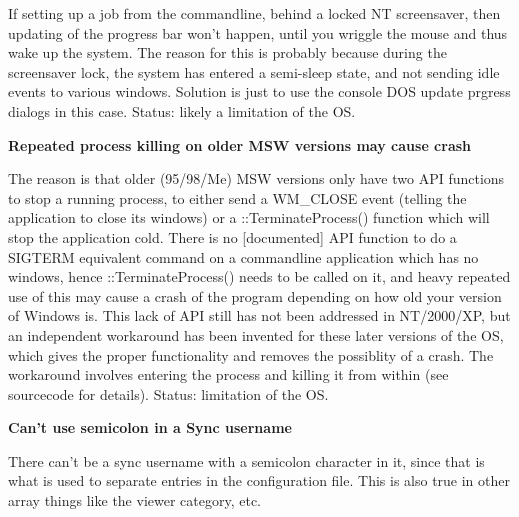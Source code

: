 \begin{helponly}
If setting up a \brandingapplicationdesktopname job from the commandline, behind a locked NT
screensaver, then updating of the progress bar won't happen, until you wriggle
the mouse and thus wake up the system. The reason for this is probably
because during the screensaver lock, the system has entered a semi-sleep
state, and not sending idle events to various windows. Solution is just to 
use the console DOS update prgress dialogs in this case. Status: likely a 
limitation of the OS.

\bf{Repeated process killing on older MSW versions may cause crash}

The reason is that older (95/98/Me) MSW versions only have two API functions to
stop a running process, to either send a WM\_CLOSE event (telling the application
to close its windows) or a ::TerminateProcess() function which will stop the
application cold. There is no [documented] API function to do a SIGTERM
equivalent command on a commandline application which has no windows, hence
::TerminateProcess() needs to be called on it, and heavy repeated use of this may
cause a crash of the program depending on how old your version of Windows is.
This lack of API still has not been addressed in NT/2000/XP, but an independent
workaround has been invented for these later versions of the OS, which gives the
proper functionality and removes the possiblity of a crash. The workaround
involves entering the process and killing it from within (see sourcecode for
details). Status: limitation of the OS.

\bf{Can't use semicolon in a Sync username}

There can't be a sync username with a semicolon character in it, since that is
what is used to separate entries in the configuration file.
This is also true in other array things like the viewer category, etc.

\end{helponly}

